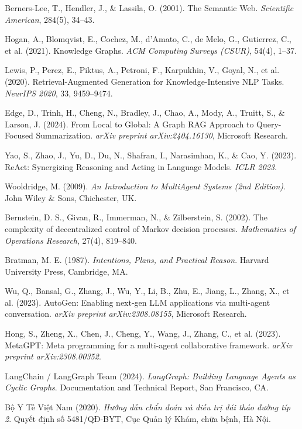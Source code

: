 \documentclass[12pt,a4paper]{report}
\begin{document}
\begin{enumerate}[leftmargin=1.5cm, label={[\arabic*]}]
    \item Berners-Lee, T., Hendler, J., \& Lassila, O. (2001). The Semantic Web. \textit{Scientific American}, 284(5), 34--43.
    \item Hogan, A., Blomqvist, E., Cochez, M., d'Amato, C., de Melo, G., Gutierrez, C., et al. (2021). Knowledge Graphs. \textit{ACM Computing Surveys (CSUR)}, 54(4), 1--37.
    \item Lewis, P., Perez, E., Piktus, A., Petroni, F., Karpukhin, V., Goyal, N., et al. (2020). Retrieval-Augmented Generation for Knowledge-Intensive NLP Tasks. \textit{NeurIPS 2020}, 33, 9459--9474.
    \item Edge, D., Trinh, H., Cheng, N., Bradley, J., Chao, A., Mody, A., Truitt, S., \& Larson, J. (2024). From Local to Global: A Graph RAG Approach to Query-Focused Summarization. \textit{arXiv preprint arXiv:2404.16130}, Microsoft Research.
    \item Yao, S., Zhao, J., Yu, D., Du, N., Shafran, I., Narasimhan, K., \& Cao, Y. (2023). ReAct: Synergizing Reasoning and Acting in Language Models. \textit{ICLR 2023}.
    \item Wooldridge, M. (2009). \textit{An Introduction to MultiAgent Systems (2nd Edition)}. John Wiley \& Sons, Chichester, UK.
    \item Bernstein, D. S., Givan, R., Immerman, N., \& Zilberstein, S. (2002). The complexity of decentralized control of Markov decision processes. \textit{Mathematics of Operations Research}, 27(4), 819--840.
    \item Bratman, M. E. (1987). \textit{Intentions, Plans, and Practical Reason}. Harvard University Press, Cambridge, MA.
    \item Wu, Q., Bansal, G., Zhang, J., Wu, Y., Li, B., Zhu, E., Jiang, L., Zhang, X., et al. (2023). AutoGen: Enabling next-gen LLM applications via multi-agent conversation. \textit{arXiv preprint arXiv:2308.08155}, Microsoft Research.
    \item Hong, S., Zheng, X., Chen, J., Cheng, Y., Wang, J., Zhang, C., et al. (2023). MetaGPT: Meta programming for a multi-agent collaborative framework. \textit{arXiv preprint arXiv:2308.00352}.
    \item LangChain / LangGraph Team (2024). \textit{LangGraph: Building Language Agents as Cyclic Graphs}. Documentation and Technical Report, San Francisco, CA.
    \item Bộ Y Tế Việt Nam (2020). \textit{Hướng dẫn chẩn đoán và điều trị đái tháo đường típ 2}. Quyết định số 5481/QĐ-BYT, Cục Quản lý Khám, chữa bệnh, Hà Nội.

\end{enumerate}
\end{document}
